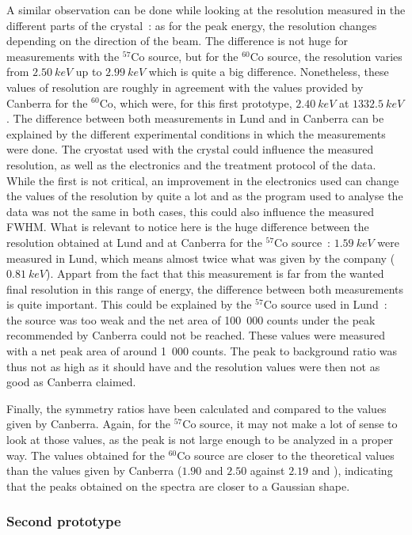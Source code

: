 \documentclass[11pt,a4paper]{article}
\begin{document}
A similar observation can be done while looking at the resolution measured in the different parts of the crystal~: as for the peak energy, the resolution changes depending on the direction of the beam. The difference is not huge for measurements with the $^{57}$Co source, but for the $^{60}$Co source, the resolution varies from $2.50~keV$ up to $2.99~keV$ which is quite a big difference. Nonetheless, these values of resolution are roughly in agreement with the values provided by Canberra for the $^{60}$Co, which were, for this first prototype, $2.40~keV$ at $1332.5~keV$. The difference between both measurements in Lund and in Canberra can be explained by the different experimental conditions in which the measurements were done. The cryostat used with the crystal could influence the measured resolution, as well as the electronics and the treatment protocol of the data. While the first is not critical, an improvement in the electronics used can change the values of the resolution by quite a lot and as the program used to analyse the data was not the same in both cases, this could also influence the measured FWHM. What is relevant to notice here is the huge difference between the resolution obtained at Lund and at Canberra for the $^{57}$Co source~: $1.59~keV$ were measured in Lund, which means almost twice what was given by the company ($0.81~keV$). Appart from the fact that this measurement is far from the wanted final resolution in this range of energy, the difference between both measurements is quite important. This could be explained by the $^{57}$Co source used in Lund~: the source was too weak and the net area of 100~000 counts under the peak recommended by Canberra could not be reached. These values were measured with a net peak area of around 1~000 counts. The peak to background ratio was thus not as high as it should have and the resolution values were then not as good as Canberra claimed.

Finally, the symmetry ratios have been calculated and compared to the values given by Canberra. Again, for the $^{57}$Co source, it may not make a lot of sense to look at those values, as the peak is not large enough to be analyzed in a proper way. The values obtained for the $^{60}$Co source are closer to the theoretical values than the values given by Canberra ($1.90$ and $2.50$ against $2.19$ and $ $), indicating that the peaks obtained on the spectra are closer to a Gaussian shape.

\subsubsection{Second prototype}
\end{document}
